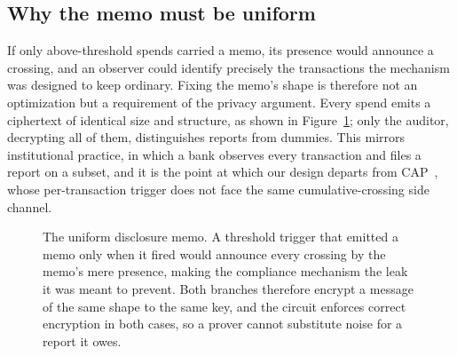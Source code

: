 \documentclass[11pt,a4paper]{article}
\theoremstyle{definition}
\theoremstyle{plain}
\theoremstyle{remark}
\newcommand{\pid}{\ensuremath{\mathsf{pid}}}
\newcommand{\Enc}{\ensuremath{\mathsf{Enc}}}
\begin{document}
\subsection{Why the memo must be uniform}
\label{sec:uniform}

If only above-threshold spends carried a memo, its presence would announce a crossing, and an observer could identify precisely the transactions the mechanism was designed to keep ordinary. Fixing the memo's shape is therefore not an optimization but a requirement of the privacy argument. Every spend emits a ciphertext of identical size and structure, as shown in Figure~\ref{fig:memo}; only the auditor, decrypting all of them, distinguishes reports from dummies. This mirrors institutional practice, in which a bank observes every transaction and files a report on a subset, and it is the point at which our design departs from CAP~\cite{cap}, whose per-transaction trigger does not face the same cumulative-crossing side channel.

\begin{figure}[t]
\centering
{}
\caption{The uniform disclosure memo. A threshold trigger that emitted a memo only when it fired would announce every crossing by the memo's mere presence, making the compliance mechanism the leak it was meant to prevent. Both branches therefore encrypt a message of the same shape to the same key, and the circuit enforces correct encryption in both cases, so a prover cannot substitute noise for a report it owes.}
\label{fig:memo}
\end{figure}
\end{document}
